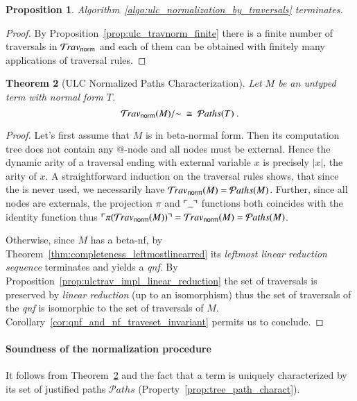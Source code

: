 \documentclass{elsarticle}
\theoremstyle{plain}
\newtheorem{theorem}{Theorem}[section]
\newtheorem{proposition}[theorem]{Proposition}
\theoremstyle{definition}
\theoremstyle{remark}
\newtheorem{remark}{Remark}[section]
\newcommand{\normalizing}{{\sf norm}}
\newcommand{\travsetnorm}{\travset_\normalizing}
\newcommand{\travulc}{\travset}
\def\coresymbol{\pi} %
\newcommand{\core}[1]{\coresymbol(#1)} %
\newcommand\pathset{{\mathcal{P}aths}} %
\begin{document}
\begin{proposition}
Algorithm~\ref{algo:ulc_normalization_by_traversals} terminates.
\end{proposition}
\begin{proof}
By Proposition~\ref{prop:ulc_travnorm_finite} there is a finite number of traversals in $\travsetnorm$ and each of them can be obtained with finitely many applications of traversal rules.
\end{proof}

\begin{theorem}[ULC Normalized Paths Characterization]
\label{thm:path_charact_ulc}
Let $M$ be an untyped term with normal form $T$.
$$\travsetnorm(M)/{\sim} \ \cong\ \pathset(T) \ .$$
\end{theorem}
\begin{proof}
Let's first assume that $M$ is in beta-normal form. Then its computation tree does not contain any $@$-node and all nodes must be external.
Hence the dynamic arity of a traversal ending with external variable $x$ is precisely $|x|$, the arity of $x$. A straightforward induction on the traversal
rules shows, that since the  is never used, we necessarily have  $\travsetnorm(M) = \pathset(M)$. Further, since all nodes are externals, the projection $\coresymbol$ and $\ulcorner \_ \urcorner$ functions both coincides with the identity function thus $\pview{\core{\travsetnorm(M)}} = \travsetnorm(M) = \pathset(M)$.

Otherwise, since $M$ has a beta-nf, by Theorem~\ref{thm:completeness_leftmostlinearred} its \emph{leftmost linear reduction sequence} terminates and yields a \emph{qnf}. By Proposition~\ref{prop:ulctrav_impl_linear_reduction} the set of traversals is preserved by \emph{linear reduction} (up to an isomorphism) thus the set of traversals of the \emph{qnf} is isomorphic to the set of traversals of $M$. Corollary~\ref{cor:qnf_and_nf_traveset_invariant} permits us to conclude.
\end{proof}

\paragraph{Soundness of the normalization procedure} It follows from Theorem~\ref{thm:path_charact_ulc} and the fact that a term is uniquely characterized by its set of justified paths $\pathset$ (Property~\ref{prop:tree_path_charact}).

\end{document}
